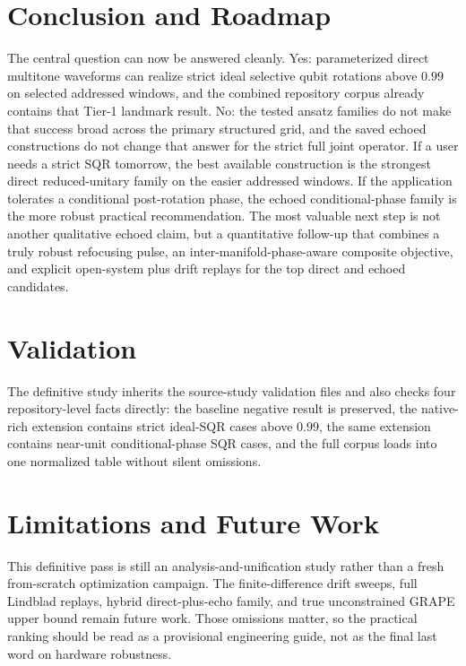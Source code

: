 \documentclass[aps,pra,twocolumn,reprint,floatfix,amsmath,amssymb]{revtex4-2}
\begin{document}
\section{Conclusion and Roadmap}
The central question can now be answered cleanly. Yes: parameterized direct multitone waveforms can realize strict ideal selective qubit rotations above $0.99$ on selected addressed windows, and the combined repository corpus already contains that Tier-1 landmark result. No: the tested ansatz families do not make that success broad across the primary structured grid, and the saved echoed constructions do not change that answer for the strict full joint operator. If a user needs a strict SQR tomorrow, the best available construction is the strongest direct reduced-unitary family on the easier addressed windows. If the application tolerates a conditional post-rotation phase, the echoed conditional-phase family is the more robust practical recommendation. The most valuable next step is not another qualitative echoed claim, but a quantitative follow-up that combines a truly robust refocusing pulse, an inter-manifold-phase-aware composite objective, and explicit open-system plus drift replays for the top direct and echoed candidates.

\section{Validation}
The definitive study inherits the source-study validation files and also checks four repository-level facts directly: the baseline negative result is preserved, the native-rich extension contains strict ideal-SQR cases above $0.99$, the same extension contains near-unit conditional-phase SQR cases, and the full corpus loads into one normalized table without silent omissions.

\section{Limitations and Future Work}
This definitive pass is still an analysis-and-unification study rather than a fresh from-scratch optimization campaign. The finite-difference drift sweeps, full Lindblad replays, hybrid direct-plus-echo family, and true unconstrained GRAPE upper bound remain future work. Those omissions matter, so the practical ranking should be read as a provisional engineering guide, not as the final last word on hardware robustness.

\appendix
\end{document}
